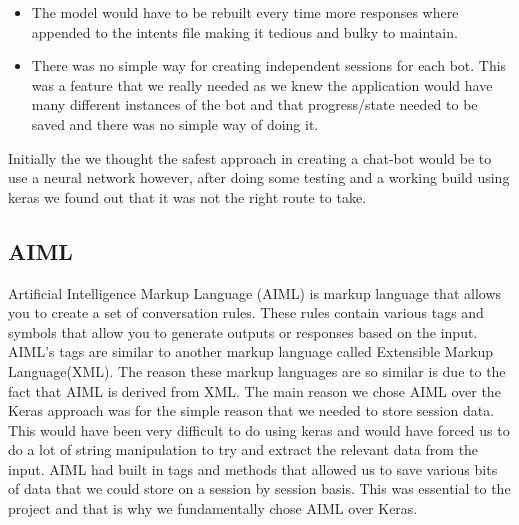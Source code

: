 \begin{itemize}
  \item The model would have to be rebuilt every time more responses where appended to the intents file making it tedious and bulky to maintain.
  \item There was no simple way for creating independent sessions for each bot. This was a feature that we really needed as we knew the application would have many different instances of the bot and that progress/state needed to be saved and there was no simple way of doing it.
\end{itemize}

Initially the we thought the safest approach in creating a chat-bot would be to use a neural network however, after doing some testing and a working build using keras we found out that it was not the right route to take.

\subsection{AIML}
Artificial Intelligence Markup Language (AIML) is markup language that allows you to create a set of conversation rules. These rules contain various tags and symbols that allow you to generate outputs or responses based on the input. AIML's tags are similar to another markup language called Extensible Markup Language(XML). The reason these markup languages are so similar is due to the fact that AIML is derived from XML. The main reason we chose AIML over the Keras approach was for the simple reason that we needed to store session data. This would have been very difficult to do using keras and would have forced us to do a lot of string manipulation to try and extract the relevant data from the input. AIML had built in tags and methods that allowed us to save various bits of data that we could store on a session by session basis. This was essential to the project and that is why we fundamentally chose AIML over Keras.
\newline

